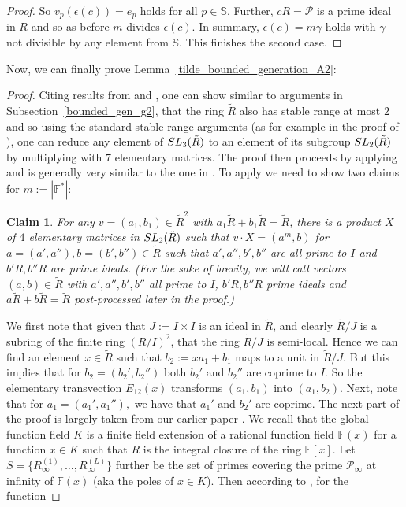 \documentclass[12pt]{amsart}
\newcommand{\C}[1]{{\mathcal #1}}
\newtheorem{claim}{Claim}
\theoremstyle{definition}\newtheorem{definition}[theorem]{Definition}
\theoremstyle{remark}\newtheorem{remark}[theorem]{Remark}
\theoremstyle{definition}\newtheorem{case}{Case}
\begin{document}
\begin{proof}
So $v_p(\epsilon(c))=e_p$ holds for all $p\in\mathbb{S}.$ Further, $cR=\C P$ is a prime ideal in $R$ and so as before $m$ divides $\epsilon(c).$ In summary, $\epsilon(c)=m\gamma$ holds with $\gamma$ not divisible by any element from $\mathbb{S}.$ This finishes the second case.
\end{proof}

Now, we can finally prove Lemma~\ref{tilde_bounded_generation_A2}:

\begin{proof}
Citing results from \cite{ESTES1967343} and \cite{STEIN1971140}, one can show similar to arguments in Subsection~\ref{bounded_gen_g2}, that the ring $\tilde{R}$ also has stable range at most $2$ and so using the standard stable range arguments (as for example in the proof of \cite[Main Theorem]{MR704220}), one can reduce any element of ${\rm SL}_3(\tilde{R})$ to an element of its subgroup ${\rm SL}_2(\tilde{R})$ by multiplying with $7$ elementary matrices. The proof then proceeds by applying \cite[Proposition~4.1]{gvozdevsky2023width} and is generally very similar to the one in \cite{gvozdevsky2023width}. To apply \cite[Proposition~4.1]{gvozdevsky2023width} we need to show two claims for $m:=|\mathbb{F}^*|$:
\begin{claim}\label{Claim1_bounded_gen_sl}
For any $v=(a_1,b_1)\in\tilde{R}^2$ with $a_1\tilde{R}+b_1\tilde{R}=\tilde{R}$, there is a product $X$ of $4$ elementary matrices in ${\rm SL}_2(\tilde{R})$ such that $v\cdot X=(a^m,b)$ for $a=(a',a''),b=(b',b'')\in\tilde{R}$ such that $a',a'',b',b''$ are all prime to $I$ and $b'R,b''R$ are prime ideals. (For the sake of brevity, we will call vectors $(a,b)\in\tilde{R}$ with $a',a'',b',b''$ all prime to $I$, $b'R,b''R$ prime ideals and $a\tilde{R}+b\tilde{R}=\tilde{R}$ \emph{post-processed} later in the proof.)
\end{claim}
We first note that given that $J:=I\times I$ is an ideal in $\tilde{R}$, and clearly $\tilde{R}/J$ is a subring of the finite ring $(R/I)^2$, that the ring $\tilde{R}/J$ is semi-local. Hence we can find an element $x\in\tilde{R}$ such that 
$b_2:=xa_1+b_1$ maps to a unit in $\tilde{R}/J.$ But this implies that for $b_2=(b_2',b_2'')$ both $b_2'$ and $b_2''$ are coprime to $I.$ So the elementary transvection $E_{12}(x)$ transforms $(a_1,b_1)$ into $(a_1,b_2).$ Next, note that for $a_1=(a_1',a_1''),$ we have that $a_1'$ and $b_2'$ are coprime. The next part of the proof is largely taken from our earlier paper \cite{https://doi.org/10.1112/blms.12925}. We recall that the global function field $K$ is a finite field extension of a rational function field $\mathbb{F}(x)$ for a function $x\in K$ such that $R$ is the integral closure of the ring $\mathbb{F}[x].$ Let $S=\{R_{\infty}^{(1)},\dots,R_{\infty}^{(L)}\}$ further be the set of primes covering the prime $\C P_{\infty}$ at infinity of $\mathbb{F}(x)$ (aka the poles of $x\in K$). Then according to \cite[A16]{MR244257}, for the function

\end{proof}
\end{document}
